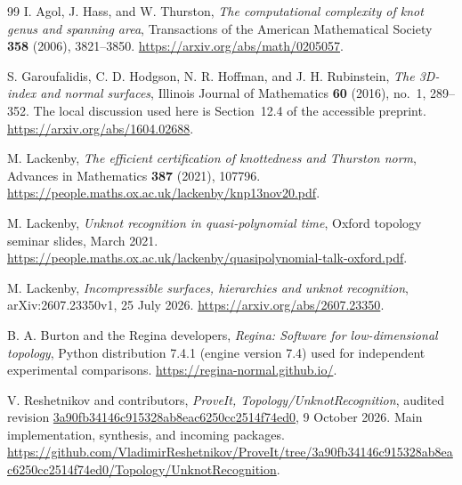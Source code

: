 \documentclass[11pt,letterpaper]{article}
\theoremstyle{definition}
\theoremstyle{remark}
\begin{document}
\clearpage
\begin{thebibliography}{99}
I. Agol, J. Hass, and W. Thurston,
\emph{The computational complexity of knot genus and spanning area},
Transactions of the American Mathematical Society \textbf{358} (2006),
3821--3850. \url{https://arxiv.org/abs/math/0205057}.

S. Garoufalidis, C. D. Hodgson, N. R. Hoffman, and J. H. Rubinstein,
\emph{The 3D-index and normal surfaces},
Illinois Journal of Mathematics \textbf{60} (2016), no.~1, 289--352.
The local discussion used here is Section~12.4 of the accessible preprint.
\url{https://arxiv.org/abs/1604.02688}.

M. Lackenby,
\emph{The efficient certification of knottedness and Thurston norm},
Advances in Mathematics \textbf{387} (2021), 107796.
\url{https://people.maths.ox.ac.uk/lackenby/knp13nov20.pdf}.

M. Lackenby,
\emph{Unknot recognition in quasi-polynomial time},
Oxford topology seminar slides, March 2021.
\url{https://people.maths.ox.ac.uk/lackenby/quasipolynomial-talk-oxford.pdf}.

M. Lackenby,
\emph{Incompressible surfaces, hierarchies and unknot recognition},
arXiv:2607.23350v1, 25 July 2026.
\url{https://arxiv.org/abs/2607.23350}.

B. A. Burton and the Regina developers,
\emph{Regina: Software for low-dimensional topology}, Python distribution
7.4.1 (engine version 7.4) used for independent experimental comparisons.
\url{https://regina-normal.github.io/}.

V. Reshetnikov and contributors,
\emph{ProveIt, Topology/UnknotRecognition},
audited revision \url{3a90fb34146c915328ab8eac6250cc2514f74ed0},
9 October 2026. Main implementation, synthesis, and incoming packages.
\url{https://github.com/VladimirReshetnikov/ProveIt/tree/3a90fb34146c915328ab8eac6250cc2514f74ed0/Topology/UnknotRecognition}.
\end{thebibliography}
\end{document}
